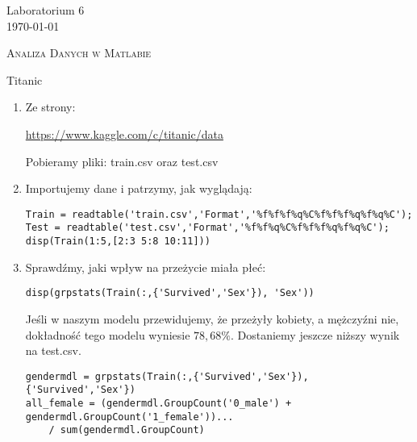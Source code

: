 \documentclass[12pt]{amsbook}
\theoremstyle{definition}
\begin{document}
\begin{center}
\large{Laboratorium 6}\\
\today
\end{center}

\hspace{3cm}

\begin{center}
\textsc{Analiza Danych w Matlabie}\\
\end{center}

\hspace{3cm}


\begin{center}
Titanic\\
\end{center}

\begin{enumerate}
\item Ze strony:

\url{https://www.kaggle.com/c/titanic/data}

Pobieramy pliki: train.csv oraz test.csv

\item Importujemy dane i patrzymy, jak wyglądają:\\

\begin{lstlisting}
Train = readtable('train.csv','Format','%f%f%f%q%C%f%f%f%q%f%q%C');
Test = readtable('test.csv','Format','%f%f%q%C%f%f%f%q%f%q%C');
disp(Train(1:5,[2:3 5:8 10:11]))
\end{lstlisting}

\item Sprawdźmy, jaki wpływ na przeżycie miała płeć:\\

\begin{lstlisting}
disp(grpstats(Train(:,{'Survived','Sex'}), 'Sex'))

\end{lstlisting}

Jeśli w naszym modelu przewidujemy, że przeżyły kobiety, a mężczyźni nie, dokładność tego modelu wyniesie $78,68\%$.
Dostaniemy jeszcze niższy wynik na test.csv.

\begin{lstlisting}
gendermdl = grpstats(Train(:,{'Survived','Sex'}), {'Survived','Sex'})
all_female = (gendermdl.GroupCount('0_male') + gendermdl.GroupCount('1_female'))...
    / sum(gendermdl.GroupCount)

\end{lstlisting}


\end{enumerate}
\end{document}

